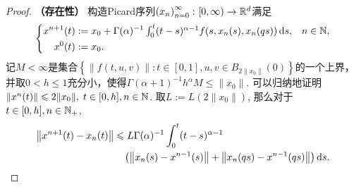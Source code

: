 \begin{proof}
    \textbf{（存在性）} 构造Picard序列$\left(x_n\right)_{n=0}^\infty\colon [0,\infty)\to \mathbb{R}^d$满足
    \begin{equation*}
        \left\{\begin{aligned}
            x^{n+1}(t)&:=x_0 + \Gamma(\alpha)^{-1} \textstyle\int_0^t (t-s)^{\alpha-1} f(s,x_n(s),x_n(qs))\mathop{}\!\mathrm{d} s, & n\in \mathbb{N},\\
            x^0(t)&:=x_0. & {}
        \end{aligned}\right.
    \end{equation*}
    记$M<\infty$是集合$\left\{\left\|f(t,u,v)\right\|\colon t\in [0,1], u,v\in B_{2\|x_0\|}(0)\right\}$的一个上界，并取$0<h\leqslant 1$充分小，使得$\Gamma(\alpha + 1)^{-1} h^\alpha M \leqslant \|x_0\|$. 可以归纳地证明$\left\|x^{n}(t)\right\|\leqslant 2\|x_0\|,\;t\in [0,h],n\in \mathbb{N}$. 取$L:=L(2\|x_0\|)$, 那么对于$t\in [0,h],n\in \mathbb{N_+}$,
    \begin{equation}
        \begin{aligned}
            \left\| x^{n+1}(t)-x_n(t) \right\|&\leqslant L\Gamma(\alpha)^{-1}\int_0^t (t-s)^{\alpha-1} \\ &\relphantom{\leqslant}\bigl(\left\|x_n(s)-x^{n-1}(s)\right\| + \left\|x_n(qs)-x^{n-1}(qs)\right\|\bigr) \differential s.
        \end{aligned}
    \end{equation}


\end{proof}
